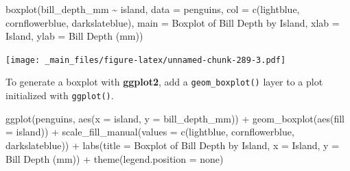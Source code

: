 \documentclass[
]{book}
\newenvironment{Shaded}{\begin{snugshade}}{\end{snugshade}}
\newcommand{\AttributeTok}[1]{\textcolor[rgb]{0.77,0.63,0.00}{#1}}
\newcommand{\FunctionTok}[1]{\textcolor[rgb]{0.00,0.00,0.00}{#1}}
\newcommand{\NormalTok}[1]{#1}
\newcommand{\SpecialCharTok}[1]{\textcolor[rgb]{0.00,0.00,0.00}{#1}}
\newcommand{\StringTok}[1]{\textcolor[rgb]{0.31,0.60,0.02}{#1}}
\begin{document}
\begin{Shaded}
\begin{Highlighting}[]
\FunctionTok{boxplot}\NormalTok{(bill\_depth\_mm }\SpecialCharTok{\textasciitilde{}}\NormalTok{ island, }\AttributeTok{data =}\NormalTok{ penguins, }\AttributeTok{col =} \FunctionTok{c}\NormalTok{(}\StringTok{\textquotesingle{}lightblue\textquotesingle{}}\NormalTok{, }\StringTok{\textquotesingle{}cornflowerblue\textquotesingle{}}\NormalTok{, }\StringTok{\textquotesingle{}darkslateblue\textquotesingle{}}\NormalTok{),}
        \AttributeTok{main =} \StringTok{\textquotesingle{}Boxplot of Bill Depth by Island\textquotesingle{}}\NormalTok{, }\AttributeTok{xlab =} \StringTok{\textquotesingle{}Island\textquotesingle{}}\NormalTok{, }\AttributeTok{ylab =} \StringTok{\textquotesingle{}Bill Depth (mm)\textquotesingle{}}\NormalTok{)}
\end{Highlighting}
\end{Shaded}

\texttt{[image: \_main\_files/figure-latex/unnamed-chunk-289-3.pdf]}

To generate a boxplot with \textbf{ggplot2}, add a \texttt{geom\_boxplot()} layer to a plot initialized with \texttt{ggplot()}.

\begin{Shaded}
\begin{Highlighting}[]
\FunctionTok{ggplot}\NormalTok{(penguins, }\FunctionTok{aes}\NormalTok{(}\AttributeTok{x =}\NormalTok{ island, }\AttributeTok{y =}\NormalTok{ bill\_depth\_mm)) }\SpecialCharTok{+}
  \FunctionTok{geom\_boxplot}\NormalTok{(}\FunctionTok{aes}\NormalTok{(}\AttributeTok{fill =}\NormalTok{ island)) }\SpecialCharTok{+}
  \FunctionTok{scale\_fill\_manual}\NormalTok{(}\AttributeTok{values =} \FunctionTok{c}\NormalTok{(}\StringTok{\textquotesingle{}lightblue\textquotesingle{}}\NormalTok{, }\StringTok{\textquotesingle{}cornflowerblue\textquotesingle{}}\NormalTok{, }\StringTok{\textquotesingle{}darkslateblue\textquotesingle{}}\NormalTok{)) }\SpecialCharTok{+}
  \FunctionTok{labs}\NormalTok{(}\AttributeTok{title =} \StringTok{\textquotesingle{}Boxplot of Bill Depth by Island\textquotesingle{}}\NormalTok{, }
       \AttributeTok{x =} \StringTok{\textquotesingle{}Island\textquotesingle{}}\NormalTok{, }\AttributeTok{y =} \StringTok{\textquotesingle{}Bill Depth (mm)\textquotesingle{}}\NormalTok{) }\SpecialCharTok{+}
  \FunctionTok{theme}\NormalTok{(}\AttributeTok{legend.position =} \StringTok{\textquotesingle{}none\textquotesingle{}}\NormalTok{)}
\end{Highlighting}
\end{Shaded}
\end{document}
